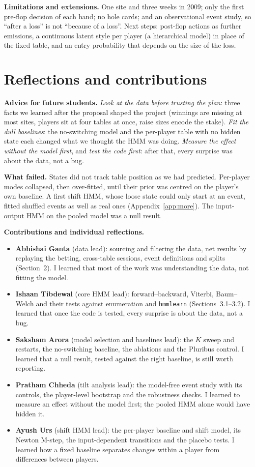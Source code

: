 \documentclass{article}
\begin{document}
\textbf{Limitations and extensions.} One site and three weeks in 2009; only the first pre-flop decision of each hand; no hole cards; and an observational event study, so ``after a loss'' is not ``because of a loss''. Next steps: post-flop actions as further emissions, a continuous latent style per player (a hierarchical model) in place of the fixed table, and an entry probability that depends on the size of the loss.

\section{Reflections and contributions}
\textbf{Advice for future students.} \emph{Look at the data before trusting the plan}: three facts we learned after the proposal shaped the project (winnings are missing at most sites, players sit at four tables at once, raise sizes encode the stake). \emph{Fit the dull baselines}: the no-switching model and the per-player table with no hidden state each changed what we thought the HMM was doing. \emph{Measure the effect without the model first}, and \emph{test the code first}: after that, every surprise was about the data, not a bug.

\textbf{What failed.} States did not track table position as we had predicted. Per-player modes collapsed, then over-fitted, until their prior was centred on the player's own baseline. A first shift HMM, whose loose state could only start at an event, fitted shuffled events as well as real ones (Appendix~\ref{app:more}). The input-output HMM on the pooled model was a null result.

\textbf{Contributions and individual reflections.}
\begin{itemize}
\item \textbf{Abhishai Ganta} (data lead): sourcing and filtering the data, net results by replaying the betting, cross-table sessions, event definitions and splits (Section~2). I learned that most of the work was understanding the data, not fitting the model.
\item \textbf{Ishaan Tibdewal} (core HMM lead): forward--backward, Viterbi, Baum--Welch and their tests against enumeration and \texttt{hmmlearn} (Sections~3.1--3.2). I learned that once the code is tested, every surprise is about the data, not a bug.
\item \textbf{Saksham Arora} (model selection and baselines lead): the $K$ sweep and restarts, the no-switching baseline, the ablations and the Pluribus control. I learned that a null result, tested against the right baseline, is still worth reporting.
\item \textbf{Pratham Chheda} (tilt analysis lead): the model-free event study with its controls, the player-level bootstrap and the robustness checks. I learned to measure an effect without the model first; the pooled HMM alone would have hidden it.
\item \textbf{Ayush Urs} (shift HMM lead): the per-player baseline and shift model, its Newton M-step, the input-dependent transitions and the placebo tests. I learned how a fixed baseline separates changes within a player from differences between players.
\end{itemize}
\end{document}
